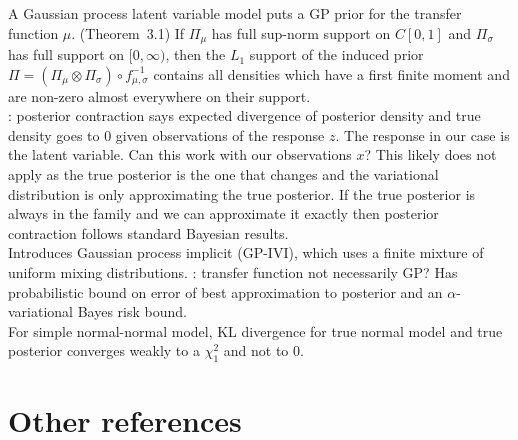 \documentclass[10pt]{article}
\begin{document}
A Gaussian process latent variable model puts a GP prior for the transfer function $\mu$. (Theorem~3.1) If $\Pi_\mu$ has full sup-norm support on $C[0,1]$ and $\Pi_\sigma$ has full support on $[0,\infty)$, then the $L_1$ support of the induced prior $\Pi=(\Pi_\mu\otimes\Pi_\sigma)\circ f_{\mu,\sigma}^{-1}$ contains all densities which have a first finite moment and are non-zero almost everywhere on their support.
\\

\todo: posterior contraction says expected divergence of posterior density and true density goes to 0 given observations of the response $z$. The response in our case is the latent variable. Can this work with our observations $x$? This likely does not apply as the true posterior is the one that changes and the variational distribution is only approximating the true posterior. If the true posterior is always in the family and we can approximate it exactly then posterior contraction follows standard Bayesian results.
\\

Introduces Gaussian process implicit \vi (GP-IVI), which uses a finite mixture of uniform mixing distributions. \todo: transfer function not necessarily GP? Has probabilistic bound on error of best approximation to posterior and an $\alpha$-variational Bayes risk bound.
\\

For simple normal-normal model, KL divergence for true normal model and true posterior converges weakly to a $\chi_1^2$ and not to 0.


\newpage


\section{Other references}
\end{document}
